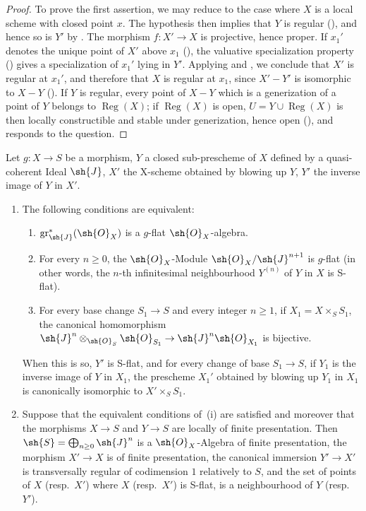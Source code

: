 \begin{proof}
To prove the first assertion, we may reduce to the case where $X$ is a local scheme with closed point $x$. The hypothesis then implies that $Y$ is regular (), and hence so is $Y'$ by .
The morphism $f:X'\to X$ is projective, hence proper. If $x_1'$ denotes the unique point of $X'$ above $x_1$ (), the valuative specialization property () gives a specialization of $x_1'$ lying in $Y'$. Applying  and , we conclude that $X'$ is regular at $x_1'$, and therefore that $X$ is regular at $x_1$, since $X'-Y'$ is isomorphic to $X-Y$ ().
If $Y$ is regular, every point of $X-Y$ which is a generization of a point of $Y$ belongs to $\operatorname{Reg}(X)$; if $\operatorname{Reg}(X)$ is open, $U=Y\cup\operatorname{Reg}(X)$ is then locally constructible and stable under generization, hence open (), and responds to the question.
\end{proof}

\begin{proposition}[19.4.6]
\label{IV.19.4.6}
Let $g:X\to S$ be a morphism, $Y$ a closed sub-prescheme of $X$ defined by a quasi-coherent Ideal $\sh{J}$, $X'$ the X-scheme obtained by blowing up $Y$, $Y'$ the inverse image of $Y$ in $X'$.
\begin{enumerate}[label=(\roman*)]
  \item The following conditions are equivalent:
  \begin{enumerate}[label=\emph{\alph*)}]
    \item $\operatorname{gr}_\sh{J}^*(\sh{O}_X)$ is a $g$-flat $\sh{O}_X$-algebra.
    \item For every $n\geq 0$, the $\sh{O}_X$-Module $\sh{O}_X/\sh{J}^{n+1}$ is $g$-flat (in other words, the $n$-th infinitesimal neighbourhood $Y^{(n)}$ of $Y$ in $X$  is S-flat).
    \item For every base change $S_1\to S$ and every integer $n\geq 1$, if $X_1=X\times_S S_1$, the canonical homomorphism $\sh{J}^n\otimes_{\sh{O}_S}\sh{O}_{S_1}\to\sh{J}^n\sh{O}_{X_1}$ is bijective.
  \end{enumerate}
When this is so, $Y'$ is S-flat, and for every change of base $S_1\to S$, if $Y_1$ is the inverse image of $Y$ in $X_1$, the prescheme $X_1'$ obtained by blowing up $Y_1$ in $X_1$ is canonically isomorphic to $X'\times_S S_1$.
  \item Suppose that the equivalent conditions of~(i) are satisfied and moreover that the morphisms $X\to S$ and $Y\to S$ are locally of finite presentation.
Then $\sh{S}=\bigoplus_{n\geq 0}\sh{J}^n$ is a $\sh{O}_X$-Algebra of finite presentation, the morphism $X'\to X$ is of finite presentation, the canonical immersion $Y'\to X'$ is transversally regular of codimension $1$ relatively to $S$, and the set of points of $X$ (resp.\ $X'$) where $X$ (resp.\ $X'$) is S-flat, is a neighbourhood of $Y$ (resp.\ $Y'$).
\end{enumerate}
\end{proposition}

